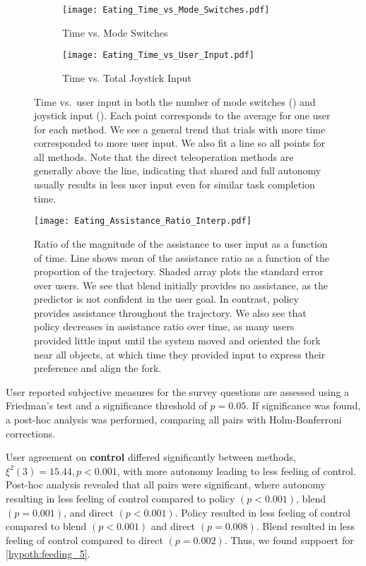 \begin{figure}[t]
  \centering
  \captionsetup[subfigure]{aboveskip=0.5pt,belowskip=+5.pt}
  \begin{subfigure}{0.47\textwidth}
    \texttt{[image: Eating\_Time\_vs\_Mode\_Switches.pdf]}
    \caption{Time vs. Mode Switches}
    \label{subfig:time_vs_mode_switch}
  \end{subfigure}
  \begin{subfigure}{0.47\textwidth}
    \texttt{[image: Eating\_Time\_vs\_User\_Input.pdf]}
    \caption{Time vs. Total Joystick Input}
    \label{subfig:time_vs_joystick}
  \end{subfigure}
  \caption{Time vs.\ user input in both the number of mode switches () and joystick input (). Each point corresponds to the average for one user for each method. We see a general trend that trials with more time corresponded to more user input. We also fit a line so all points for all methods. Note that the direct teleoperation methods are generally above the line, indicating that shared and full autonomy usually results in less user input even for similar task completion time.}
  \label{fig:time_vs_user_inputs}
\end{figure}


\begin{figure}[t]
  \texttt{[image: Eating\_Assistance\_Ratio\_Interp.pdf]}
  \caption{Ratio of the magnitude of the assistance to user input as a function of time. Line shows mean of the assistance ratio as a function of the proportion of the trajectory. Shaded array plots the standard error over users. We see that blend initially provides no assistance, as the predictor is not confident in the user goal. In contrast, policy provides assistance throughout the trajectory. We also see that policy decreases in assistance ratio over time, as many users provided little input until the system moved and oriented the fork near all objects, at which time they provided input to express their preference and align the fork.}
  \label{fig:assist_ratio_over_time}
\end{figure}

User reported subjective measures for the survey questions are assessed using a Friedman's test and a significance threshold of $p=0.05$. If significance was found, a post-hoc analysis was performed, comparing all pairs with Holm-Bonferroni corrections.

User agreement on \textbf{control} differed significantly between methods, $\xi^2(3) = 15.44, p<0.001$, with more autonomy leading to less feeling of control. Post-hoc analysis revealed that all pairs were significant, where autonomy resulting in less feeling of control compared to policy $(p<0.001)$, blend $(p=0.001)$, and direct $(p<0.001)$. Policy resulted in less feeling of control compared to blend $(p<0.001)$ and direct $(p=0.008)$. Blend resulted in less feeling of control compared to direct $(p=0.002)$. Thus, we found suppoert for \cref{hypoth:feeding_5}.

